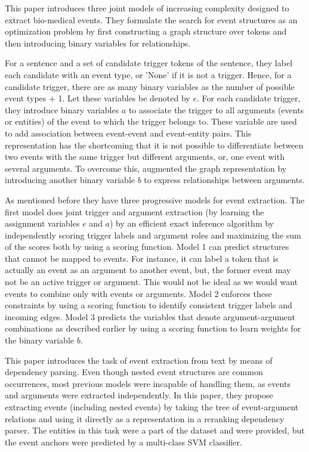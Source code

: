 
This paper introduces three joint models of increasing complexity designed to extract bio-medical events. They formulate the search for event structures as an optimization problem by first constructing a graph structure over tokens and then introducing binary variables for relationships. 

For a sentence and a set of candidate trigger tokens of the sentence, they label each candidate with an event type, or 'None' if it is not a trigger. Hence, for a candidate trigger, there are as many binary variables as the number of possible event types + 1. Let these variables be denoted by ${e}$. For each candidate trigger, they introduce binary variables ${a}$ to associate the trigger to all arguments (events or entities) of the event to which the trigger belongs to. These variable are used to add association between event-event and event-entity pairs. This representation has the shortcoming that it is not possible to differentiate between two events with the same trigger but different arguments, or, one event with several arguments. To overcome this, \citeauthor{riedelmc} augmented the graph representation by introducing another binary variable ${b}$ to express relationships between arguments. 

As mentioned before they have three progressive models for event extraction. The first model does joint trigger and argument extraction (by learning the assignment variables ${e}$ and ${a}$) by an efficient exact inference algorithm by independently scoring trigger labels and argument roles and maximizing the sum of the scores both by using a scoring function. Model 1 can predict structures that cannot be mapped to events. For instance, it can label a token that is actually an event as an argument to another event, but, the former event may not be an active trigger or argument. This would not be ideal as we would want events to combine only with events or arguments. Model 2 enforces these constraints by using a scoring function to identify consistent trigger labels and incoming edges. Model 3 predicts the variables that denote argument-argument combinations as described earlier by using a scoring function to learn weights for the binary variable ${b}$.\\


This paper introduces the task of event extraction from text by means of dependency parsing. Even though nested event structures are common occurrences, most previous models were incapable of handling them, as events and arguments were extracted independently. In this paper, they propose extracting events (including nested events) by taking the tree of event-argument relations and using it directly as a representation in a reranking dependency parser. The entities in this task were a part of the dataset and were provided, but the event anchors were predicted by a multi-class SVM classifier. 

